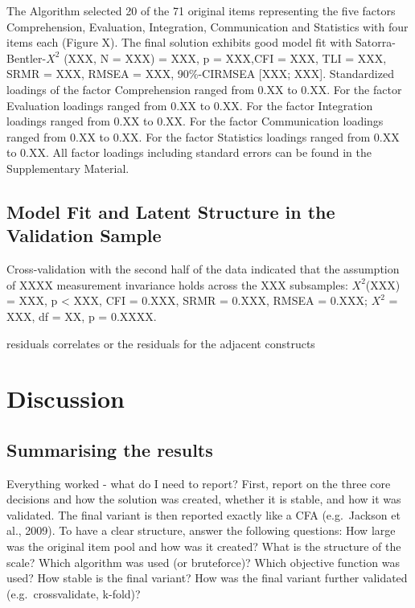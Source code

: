 \documentclass[
  12pt,
  a4paper,
  twoside]{article}
\begin{document}
The Algorithm selected 20 of the 71 original items representing the five factors Comprehension, Evaluation, Integration, Communication and Statistics with four items each (Figure X). The final solution exhibits good model fit with Satorra-Bentler-\(X^{2}\) (XXX, N = XXX) = XXX, p = XXX,CFI = XXX, TLI = XXX, SRMR = XXX, RMSEA = XXX, 90\%-CIRMSEA {[}XXX; XXX{]}.
Standardized loadings of the factor Comprehension ranged from 0.XX to 0.XX. For the factor Evaluation loadings ranged from 0.XX to 0.XX. For the factor Integration loadings ranged from 0.XX to 0.XX. For the factor Communication loadings ranged from 0.XX to 0.XX. For the factor Statistics loadings ranged from 0.XX to 0.XX.
All factor loadings including standard errors can be found in the Supplementary Material.

\subsection{Model Fit and Latent Structure in the Validation Sample}\label{model-fit-and-latent-structure-in-the-validation-sample}

Cross-validation with the second half of the data indicated that the assumption of XXXX measurement invariance holds across the XXX subsamples: \(X^{2}\)(XXX) = XXX, p \textless{} XXX, CFI = 0.XXX, SRMR = 0.XXX, RMSEA = 0.XXX; \(X^{2}\) = XXX, df = XX, p = 0.XXXX.

residuals
correlates or the residuals for the adjacent constructs

\section{Discussion}\label{discussion}

\subsection{Summarising the results}\label{summarising-the-results}

Everything worked - what do I need to report?
First, report on the three core decisions and how the solution was created, whether it is stable, and how it was validated. The final variant is then reported exactly like a CFA (e.g.~Jackson et al., 2009). To have a clear structure, answer the following questions:
How large was the original item pool and how was it created?
What is the structure of the scale?
Which algorithm was used (or bruteforce)?
Which objective function was used?
How stable is the final variant?
How was the final variant further validated (e.g.~crossvalidate, k-fold)?
\end{document}
